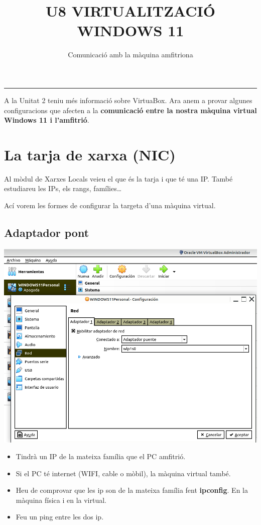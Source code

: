 \documentclass[
  12 pt,
  a4paper,
]{article}
\title{U8 VIRTUALITZACIÓ WINDOWS 11}
\subtitle{Comunicació amb la màquina amfitriona}
\author{}
\date{\vspace{-2.5em}}
\begin{document}
\maketitle

\newpage
\renewcommand\tablename{Tabla}

\begin{center}\rule{0.5\linewidth}{0.5pt}\end{center}

A la Unitat 2 teniu més informació sobre VirtuaBox. Ara anem a provar
algunes configuracions que afecten a la \textbf{comunicació entre la
nostra màquina virtual Windows 11 i l'amfitrió}.

\section{La tarja de xarxa (NIC)}\label{la-tarja-de-xarxa-nic}

Al mòdul de Xarxes Locals veieu el que és la tarja i que té una IP.
També estudiareu les IPs, els rangs, famílies\ldots{}

Ací vorem les formes de configurar la targeta d'una màquina virtual.

\subsection{Adaptador pont}\label{adaptador-pont}

\includegraphics{png/adaptadorpont.png}

\begin{itemize}
\item
  Tindrà un IP de la mateixa família que el PC amfitrió.
\item
  Si el PC té internet (WIFI, cable o mòbil), la màquina virtual també.
\item
  Heu de comprovar que les ip son de la mateixa família fent
  \textbf{ipconfig}. En la màquina física i en la virtual.
\item
  Feu un ping entre les dos ip.
\end{itemize}
\end{document}
